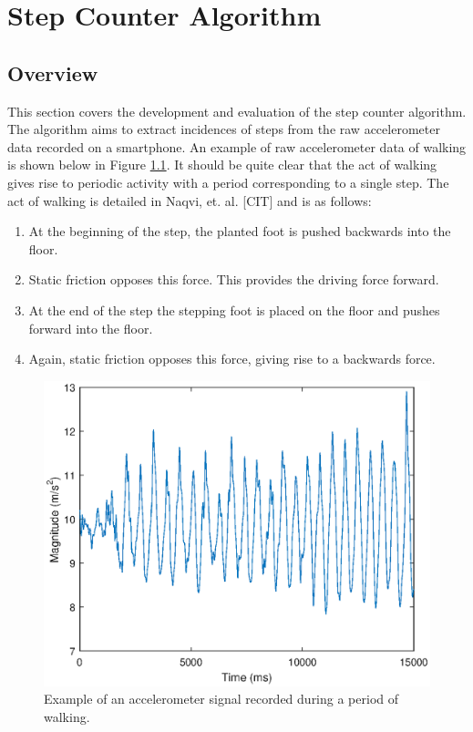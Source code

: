 \part{Step Counter Algorithm}

    \chapter{Overview}

        This section covers the development and evaluation of the step counter algorithm. The algorithm aims to extract incidences of steps from the raw accelerometer data recorded on a smartphone. An example of raw accelerometer data of walking is shown below in Figure \ref{img_accel_ex}. It should be quite clear that the act of walking gives rise to periodic activity with a period corresponding to a single step. The act of walking is detailed in Naqvi, et. al. [CIT] and is as follows:

        \begin{enumerate}
            \item At the beginning of the step, the planted foot is pushed backwards into the floor.
            \item Static friction opposes this force. This provides the driving force forward.
            \item At the end of the step the stepping foot is placed on the floor and pushes forward into the floor.
            \item Again, static friction opposes this force, giving rise to a backwards force.
        \end{enumerate}

        \begin{figure}[h]
            \includegraphics[width=\textwidth]{Images/accel_signal.eps}
            \centering
            \caption{Example of an accelerometer signal recorded during a period of walking.}
            \label{img_accel_ex}
        \end{figure}

